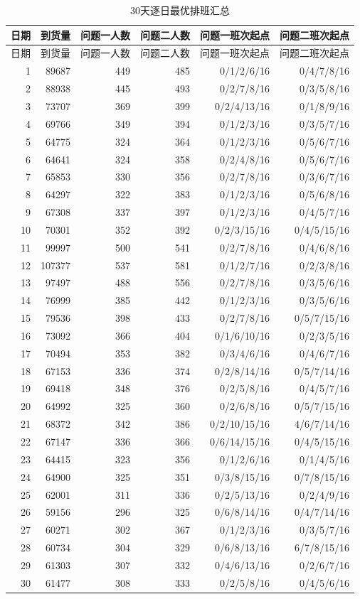\begin{longtable}{rrrrrr}
\caption{30天逐日最优排班汇总}\label{tab:daily}\\
\toprule 日期 & 到货量 & 问题一人数 & 问题二人数 & 问题一班次起点 & 问题二班次起点\\\midrule
\endfirsthead\toprule 日期 & 到货量 & 问题一人数 & 问题二人数 & 问题一班次起点 & 问题二班次起点\\\midrule\endhead
1 & 89687 & 449 & 485 & 0/1/2/6/16 & 0/4/7/8/16\\
2 & 88938 & 445 & 493 & 0/2/7/8/16 & 0/3/5/8/16\\
3 & 73707 & 369 & 399 & 0/2/4/13/16 & 0/1/8/9/16\\
4 & 69766 & 349 & 394 & 0/1/2/3/16 & 0/3/5/7/16\\
5 & 64775 & 324 & 364 & 0/1/2/3/16 & 0/5/6/7/16\\
6 & 64641 & 324 & 358 & 0/2/4/8/16 & 0/5/6/7/16\\
7 & 65853 & 330 & 356 & 0/2/7/8/16 & 0/3/6/7/16\\
8 & 64297 & 322 & 383 & 0/1/2/3/16 & 0/5/6/8/16\\
9 & 67308 & 337 & 397 & 0/1/2/3/16 & 0/4/5/7/16\\
10 & 70301 & 352 & 392 & 0/2/3/15/16 & 0/4/5/15/16\\
11 & 99997 & 500 & 541 & 0/2/7/8/16 & 0/4/6/8/16\\
12 & 107377 & 537 & 581 & 0/1/2/7/16 & 0/2/3/8/16\\
13 & 97497 & 488 & 556 & 0/2/7/8/16 & 0/3/5/6/16\\
14 & 76999 & 385 & 442 & 0/1/2/3/16 & 0/3/5/6/16\\
15 & 79536 & 398 & 433 & 0/2/7/8/16 & 0/5/7/15/16\\
16 & 73092 & 366 & 404 & 0/1/6/10/16 & 0/2/3/5/16\\
17 & 70494 & 353 & 382 & 0/3/4/6/16 & 0/4/6/7/16\\
18 & 67153 & 336 & 374 & 0/2/8/14/16 & 0/5/7/14/16\\
19 & 69418 & 348 & 376 & 0/2/5/8/16 & 0/4/5/7/16\\
20 & 64992 & 325 & 360 & 0/2/6/8/16 & 0/5/7/15/16\\
21 & 68372 & 342 & 386 & 0/2/10/15/16 & 4/6/7/14/16\\
22 & 67147 & 336 & 366 & 0/6/14/15/16 & 0/4/5/15/16\\
23 & 64415 & 323 & 356 & 0/1/2/6/16 & 0/1/4/5/16\\
24 & 64900 & 325 & 351 & 0/3/8/15/16 & 0/7/8/15/16\\
25 & 62001 & 311 & 336 & 0/2/5/13/16 & 0/2/4/9/16\\
26 & 59156 & 296 & 325 & 0/6/8/14/16 & 0/4/7/14/16\\
27 & 60271 & 302 & 367 & 0/1/2/3/16 & 0/3/5/7/16\\
28 & 60734 & 304 & 329 & 0/6/8/13/16 & 6/7/8/15/16\\
29 & 61303 & 307 & 332 & 0/4/6/13/16 & 0/2/6/7/16\\
30 & 61477 & 308 & 333 & 0/2/5/8/16 & 0/4/5/6/16\\
\bottomrule
\end{longtable}